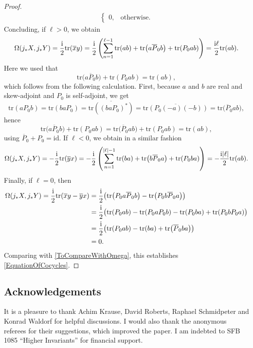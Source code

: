 \documentclass[10pt,a4paper]{amsart}
\numberwithin{equation}{section}
\newcommand{\tr}{\mathrm{tr}}
\newcommand{\id}{\mathrm{id}}
\begin{document}
\begin{proof}
\begin{align*}
\begin{cases}
 0, & \text{otherwise}.
 \end{cases}	
\end{align*}
Concluding, if $\ell >0$, we obtain
\begin{equation*}
 \Omega(j_*X, j_*Y) = \frac{{\rm i}}{2} \tr(\overline{x}y) = \frac{{\rm i}}{2} \left(\sum_{n=1}^{\ell-1}\tr(ab) + \tr\big(a\overline{P}_0 b\big) + \tr(P_0ab) \right) = \frac{{\rm i}\ell}{2}\tr(ab).
\end{equation*}
Here we used that
\[\tr\big(a\overline{P}_0 b\big) + \tr(P_0ab) = \tr(ab),\] which follows from the following calculation.
First, because $a$ and $b$ are real and skew-adjoint and $P_0$ is self-adjoint, we get
\begin{equation*}
 	\tr(aP_0b) = \tr(baP_0) = \overline{\tr((baP_0)^*)} = \overline{\tr(P_0 (-a)(-b))} = \tr\big(\overline{P}_0ab\big),
\end{equation*}
hence
\begin{equation*}
	\tr\big(a\overline{P}_0 b\big) + \tr(P_0ab) = \tr\big(\overline{P}_0 ab\big) + \tr(P_0ab) = \tr(ab),
\end{equation*}
using $\overline{P}_0 + P_0 = \id$.
If $\ell < 0$, we obtain in a similar fashion
\begin{equation*}
 \Omega(j_*X, j_*Y) = -\frac{{\rm i}}{2} \tr(\overline{y}x) = -\frac{{\rm i}}{2} \left(\sum_{n=1}^{|\ell|-1}\tr(ba) + \tr\big(b\overline{P}_0 a\big) + \tr(P_0ba) \right) = -\frac{{\rm i}|\ell|}{2}\tr(ab).
\end{equation*}
Finally, if $\ell=0$, then
\begin{equation*}
\begin{aligned}
 	\Omega(j_*X, j_*Y) = \frac{{\rm i}}{2} \tr(\overline{x}y - \overline{y}x)
 	&= \frac{{\rm i}}{2} \big(\tr\big(P_0 a\overline{P}_0b\big) - \tr\big(P_0 b\overline{P}_0a\big)\big)\\
 	&= \frac{{\rm i}}{2} \big(\tr(P_0 ab) - \tr(P_0 a{P}_0b) - \tr(P_0 ba) + \tr(P_0 bP_0a)\big) \\
 	&=\frac{{\rm i}}{2} \big(\tr(P_0 ab) - \tr(ba) + \tr\big(\overline{P}_0 ba\big) \big) \\
 	& = 0.
\end{aligned}
\end{equation*}
Comparing with \eqref{ToCompareWithOmega}, this establishes \eqref{EquationOfCocycles}.
\end{proof}

\subsection*{Acknowledgements}
It is a pleasure to thank Achim Krause, David Roberts, Raphael Schmidpeter and Konrad Waldorf for helpful discussions.
I would also thank the anonymous referees for their suggestions, which improved the paper.
I am indebted to SFB 1085 ``Higher Invariants'' for financial support.
\end{document}
